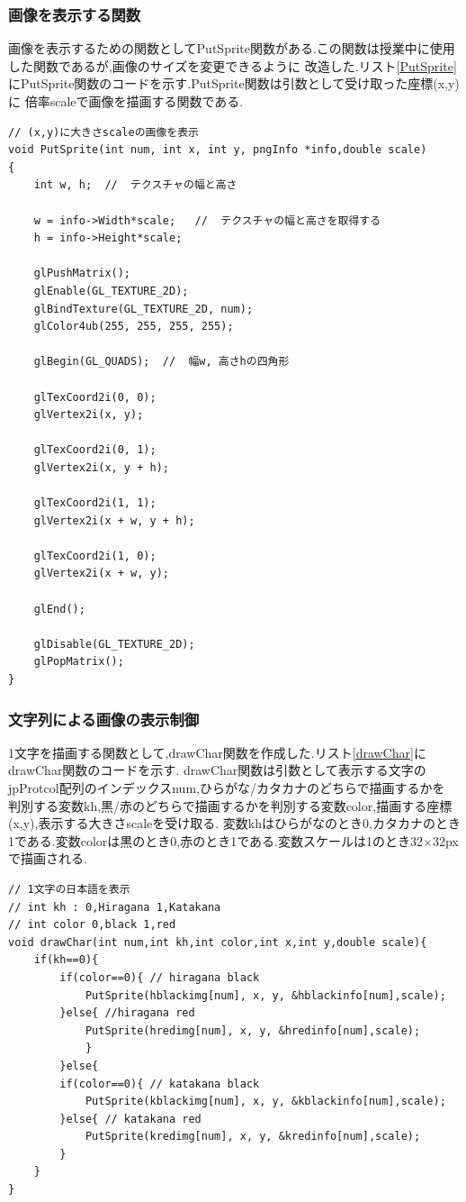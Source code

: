 \documentclass[a4j]{jarticle}
\begin{document}
    \subsubsection{画像を表示する関数}
    画像を表示するための関数としてPutSprite関数がある.この関数は授業中に使用した関数であるが,画像のサイズを変更できるように
    改造した.リスト\ref{PutSprite}にPutSprite関数のコードを示す.PutSprite関数は引数として受け取った座標(x,y)に
    倍率scaleで画像を描画する関数である.
    \begin{lstlisting}[basicstyle=\ttfamily\footnotesize, frame=single,label=PutSprite,caption=PutSprite関数]
// (x,y)に大きさscaleの画像を表示
void PutSprite(int num, int x, int y, pngInfo *info,double scale)
{
    int w, h;  //  テクスチャの幅と高さ

    w = info->Width*scale;   //  テクスチャの幅と高さを取得する
    h = info->Height*scale;

    glPushMatrix();
    glEnable(GL_TEXTURE_2D);
    glBindTexture(GL_TEXTURE_2D, num);
    glColor4ub(255, 255, 255, 255);

    glBegin(GL_QUADS);  //  幅w, 高さhの四角形

    glTexCoord2i(0, 0); 
    glVertex2i(x, y);

    glTexCoord2i(0, 1);
    glVertex2i(x, y + h);

    glTexCoord2i(1, 1);
    glVertex2i(x + w, y + h);

    glTexCoord2i(1, 0);
    glVertex2i(x + w, y);

    glEnd();

    glDisable(GL_TEXTURE_2D);
    glPopMatrix();
}
          \end{lstlisting}

    \subsubsection{文字列による画像の表示制御}
    1文字を描画する関数として,drawChar関数を作成した.リスト\ref{drawChar}にdrawChar関数のコードを示す.
    drawChar関数は引数として表示する文字のjpProtcol配列のインデックスnum,ひらがな/カタカナのどちらで描画するかを
    判別する変数kh,黒/赤のどちらで描画するかを判別する変数color,描画する座標(x,y),表示する大きさscaleを受け取る.
    変数khはひらがなのとき0,カタカナのとき1である.変数colorは黒のとき0,赤のとき1である.変数スケールは1のとき32$\times$32px
    で描画される.
    \begin{lstlisting}[basicstyle=\ttfamily\footnotesize, frame=single,label=drawChar,caption=drawChar関数]
// 1文字の日本語を表示
// int kh : 0,Hiragana 1,Katakana
// int color 0,black 1,red
void drawChar(int num,int kh,int color,int x,int y,double scale){
    if(kh==0){
        if(color==0){ // hiragana black
            PutSprite(hblackimg[num], x, y, &hblackinfo[num],scale);
        }else{ //hiragana red
            PutSprite(hredimg[num], x, y, &hredinfo[num],scale);
            }
        }else{ 
        if(color==0){ // katakana black
            PutSprite(kblackimg[num], x, y, &kblackinfo[num],scale);
        }else{ // katakana red
            PutSprite(kredimg[num], x, y, &kredinfo[num],scale);
        }
    }
}
                \end{lstlisting}
\end{document}
